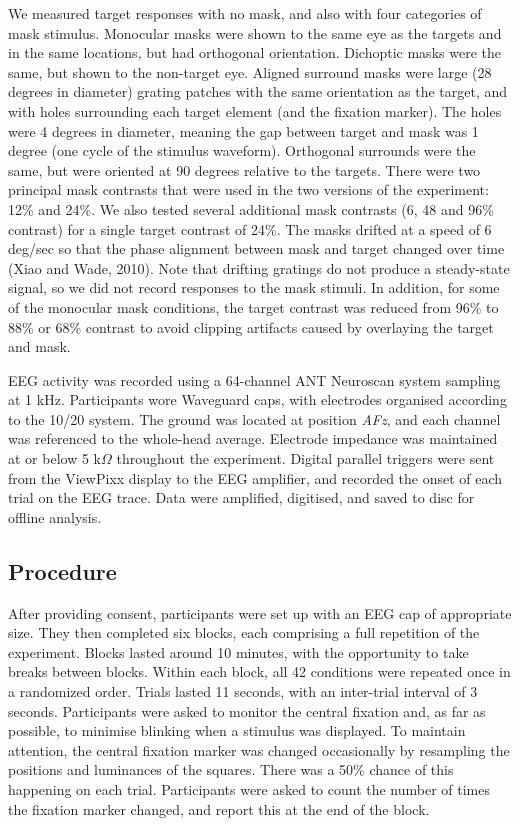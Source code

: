 \documentclass[]{article}
\begin{document}
We measured target responses with no mask, and also with four categories of mask stimulus. Monocular masks were shown to the same eye as the targets and in the same locations, but had orthogonal orientation. Dichoptic masks were the same, but shown to the non-target eye. Aligned surround masks were large (28 degrees in diameter) grating patches with the same orientation as the target, and with holes surrounding each target element (and the fixation marker). The holes were 4 degrees in diameter, meaning the gap between target and mask was 1 degree (one cycle of the stimulus waveform). Orthogonal surrounds were the same, but were oriented at 90 degrees relative to the targets. There were two principal mask contrasts that were used in the two versions of the experiment: 12\% and 24\%. We also tested several additional mask contrasts (6, 48 and 96\% contrast) for a single target contrast of 24\%. The masks drifted at a speed of 6 deg/sec so that the phase alignment between mask and target changed over time (Xiao and Wade, 2010). Note that drifting gratings do not produce a steady-state signal, so we did not record responses to the mask stimuli. In addition, for some of the monocular mask conditions, the target contrast was reduced from 96\% to 88\% or 68\% contrast to avoid clipping artifacts caused by overlaying the target and mask.

EEG activity was recorded using a 64-channel ANT Neuroscan system sampling at 1 kHz. Participants wore Waveguard caps, with electrodes organised according to the 10/20 system. The ground was located at position \emph{AFz}, and each channel was referenced to the whole-head average. Electrode impedance was maintained at or below 5 k\(\Omega\) throughout the experiment. Digital parallel triggers were sent from the ViewPixx display to the EEG amplifier, and recorded the onset of each trial on the EEG trace. Data were amplified, digitised, and saved to disc for offline analysis.

\hypertarget{procedure}{%
\subsection{Procedure}\label{procedure}}

After providing consent, participants were set up with an EEG cap of appropriate size. They then completed six blocks, each comprising a full repetition of the experiment. Blocks lasted around 10 minutes, with the opportunity to take breaks between blocks. Within each block, all 42 conditions were repeated once in a randomized order. Trials lasted 11 seconds, with an inter-trial interval of 3 seconds. Participants were asked to monitor the central fixation and, as far as possible, to minimise blinking when a stimulus was displayed. To maintain attention, the central fixation marker was changed occasionally by resampling the positions and luminances of the squares. There was a 50\% chance of this happening on each trial. Participants were asked to count the number of times the fixation marker changed, and report this at the end of the block.
\end{document}
